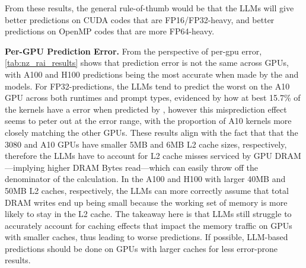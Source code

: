 From these results, the general rule-of-thumb would be that the LLMs will give better predictions on CUDA codes that are FP16/FP32-heavy, and better predictions on OpenMP codes that are more FP64-heavy.


\textbf{Per-GPU Prediction Error.}
From the perspective of per-gpu error, \autoref{tab:nz_rai_results} shows that prediction error is not the same across GPUs, with A100 and H100 predictions being the most accurate when made by the \opus and \gptfivefour models.
For FP32-\rai predictions, the LLMs tend to predict the worst on the A10 GPU across both runtimes and prompt types, evidenced by how at best 15.7\% of the kernels have a \pmten error when predicted by \opus, however this misprediction effect seems to peter out at the \pmfifty error range, with the proportion of A10 kernels more closely matching the other GPUs.
These results align with the fact that that the 3080 and A10 GPUs have smaller 5MB and 6MB L2 cache sizes, respectively, therefore the LLMs have to account for L2 cache misses serviced by GPU DRAM---implying higher DRAM Bytes read---which can easily throw off the denominator of the \rai calculation.
In the A100 and H100 with larger 40MB and 50MB L2 caches, respectively, the LLMs can more correctly assume that total DRAM writes end up being small because the working set of memory is more likely to stay in the L2 cache. 
The takeaway here is that LLMs still struggle to accurately account for caching effects that impact the memory traffic on GPUs with smaller caches, thus leading to worse predictions.
If possible, LLM-based \rai predictions should be done on GPUs with larger caches for less error-prone results.





